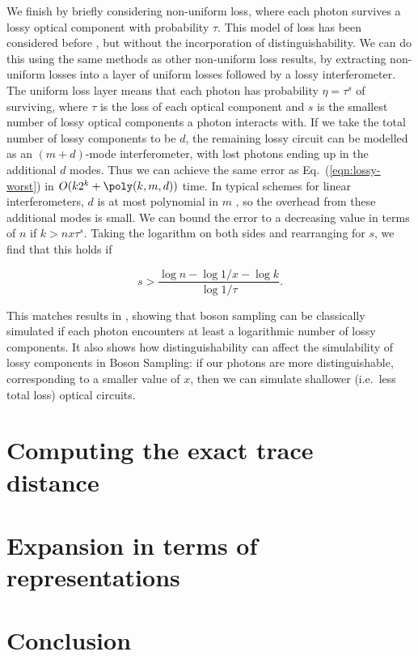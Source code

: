 We finish by briefly considering non-uniform loss, where each photon survives a lossy optical component with probability $\tau$. 
This model of loss has been considered before \cite{garciapatron2017,oszmaniec2018}, but without the incorporation of distinguishability. We can do this using the same methods as other non-uniform loss results, by extracting non-uniform losses into a layer of uniform losses followed by a lossy interferometer. 
The uniform loss layer means that each photon has probability $\eta=\tau^s$ of surviving, where $\tau$ is the loss of each optical component and $s$ is the smallest number of lossy optical components a photon interacts with. 
If we take the total number of lossy components to be $d$, the remaining lossy circuit can be modelled as an $(m+d)$-mode interferometer, with lost photons ending up in the additional $d$ modes. 
Thus we can achieve the same error as Eq.\ (\ref{eqn:lossy-worst}) in $O(k2^k+\poly(k,m,d))$ time. 
In typical schemes for linear interferometers, $d$ is at most polynomial in $m$ \cite{reck1994,clements2016}, so the overhead from these additional modes is small. 
We can bound the error to a decreasing value in terms of $n$ if $k>nx\tau^s$. Taking the logarithm on both sides and rearranging for $s$, we find that this holds if

\begin{equation}
s>\frac{\log n-\log 1/x-\log k}{\log1/\tau}.
\end{equation}

This matches results in \cite{garciapatron2017,oszmaniec2018}, showing that boson sampling can be classically simulated if each photon encounters at least a logarithmic number of lossy components. 
It also shows how distinguishability can affect the simulability of lossy components in Boson Sampling: if our photons are more distinguishable, corresponding to a smaller value of $x$, then we can simulate shallower (i.e.\ less total loss) optical circuits.

\section{Computing the exact trace distance}

\section{Expansion in terms of representations}

\section{Conclusion}
\label{sec:conclusion}

